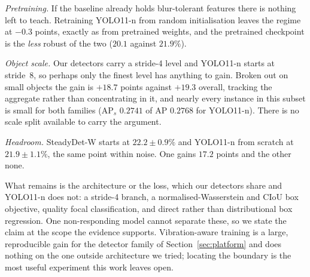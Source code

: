 \emph{Pretraining.} If the baseline already holds blur-tolerant features there is
nothing left to teach. Retraining YOLO11-n from random initialisation leaves the
regime at $-0.3$ points, exactly as from pretrained weights, and the pretrained
checkpoint is the \emph{less} robust of the two ($20.1$ against $21.9\%$).

\emph{Object scale.} Our detectors carry a stride-4 level and YOLO11-n starts at
stride~8, so perhaps only the finest level has anything to gain. Broken out on
small objects the gain is $+18.7$ points against $+19.3$ overall, tracking the
aggregate rather than concentrating in it, and nearly every instance in this subset
is small for both families (AP$_s$ $0.2741$ of AP $0.2768$ for YOLO11-n). There is
no scale split available to carry the argument.

\emph{Headroom.} SteadyDet-W starts at $22.2 \pm 0.9\%$ and YOLO11-n from scratch at
$21.9 \pm 1.1\%$, the same point within noise. One gains $17.2$ points and the
other none.

What remains is the architecture or the loss, which our detectors share and
YOLO11-n does not: a stride-4 branch, a normalised-Wasserstein and CIoU box
objective, quality focal classification, and direct rather than distributional box
regression. One non-responding model cannot separate these, so we state the claim
at the scope the evidence supports. Vibration-aware training is a large,
reproducible gain for the detector family of Section~\ref{sec:platform} and does
nothing on the one outside architecture we tried; locating the boundary is the most
useful experiment this work leaves open.

